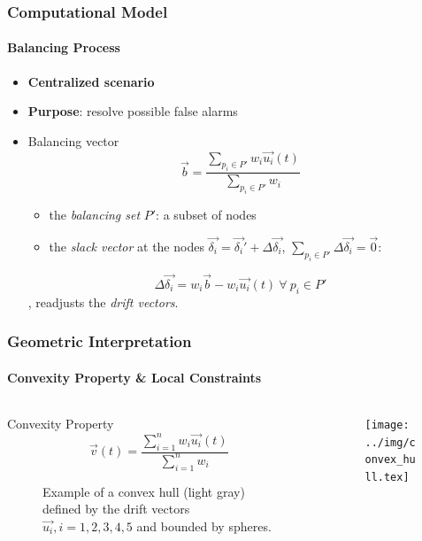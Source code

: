 \documentclass[hyperref={pdfpagelabels=false}]{beamer}
\begin{document}
\begin{frame} \frametitle{Computational Model}\framesubtitle{Balancing Process}
\begin{itemize}
\item[] \textbf{Centralized scenario}
\item[] \textbf{Purpose}: resolve possible false alarms
\item[]
\begin{block}{Balancing vector}
\begin{equation*}
\vec{b}=\frac{ \sum_{p_i \in P'} {w_i\vec{u_i}(t)} }{ \sum_{p_i \in P'} {w_i} }
\end{equation*}
\end{block}
\begin{itemize}
	\item the \emph{balancing set} $P'$: a subset of nodes
	\item the \emph{slack vector} at the nodes $\vec{\delta_i}=\vec{\delta_i}'+\Delta\vec{\delta_i}$, $\sum_{p_i \in P'} \Delta \vec{\delta_i}= \vec{0}$:
\end{itemize}
\begin{equation*}
\Delta\vec{\delta_i}=w_i\vec{b}-w_i\vec{u_i}(t)\ \forall\ p_i \in P'
\end{equation*}
, readjusts the \emph{drift vectors}.
\end{itemize}
\end{frame}

\begin{frame} \frametitle{Geometric Interpretation}\framesubtitle{Convexity Property \& Local Constraints}
\begin{columns}
\begin{column}[t]{0.35\textwidth}
\begin{block}{Convexity Property}
\begin{equation*}
\vec{v}(t)=\frac{\sum_{i=1}^n {w_i\vec{u_i}(t)}}{\sum_{i=1}^n {w_i}}
\end{equation*}
\vspace{0.2cm}
\end{block}
\begin{figure}[H]
\vspace{-0.2cm}
\caption{Example of a convex hull (light gray) defined by the drift vectors $\vec{u_i}, i=1,2,3,4,5$ and bounded by spheres.}
\end{figure}
\end{column}
\begin{column}[t]{0.65\textwidth}
\begin{figure}[H]
\vspace{-.8cm}
\texttt{[image: ../img/convex\_hull.tex]}
\end{figure}
\end{column}
\end{columns}
\end{frame}
\end{document}
